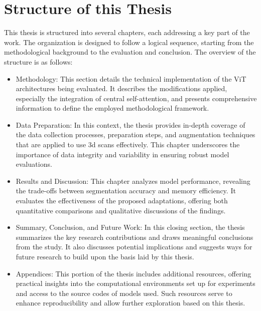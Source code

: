 \section{Structure of this Thesis}
This thesis is structured into several chapters, each addressing a key part of the work. The organization is designed to follow a logical sequence, starting from the methodological background to the evaluation and conclusion. The overview of the structure is as follows:
\begin{itemize}
	\item Methodology: This section details the technical implementation of the ViT architectures being evaluated. It describes the modifications applied, especially the integration of central self-attention, and presents comprehensive information to define the employed methodological framework.
	
	\item Data Preparation: In this context, the thesis provides in-depth coverage of the data collection processes, preparation steps, and augmentation techniques that are applied to use \gls{3d} scans effectively. This chapter underscores the importance of data integrity and variability in ensuring robust model evaluations.
	
	\item Results and Discussion: This chapter analyzes model performance, revealing the trade-offs between segmentation accuracy and memory efficiency. It evaluates the effectiveness of the proposed adaptations, offering both quantitative comparisons and qualitative discussions of the findings.
	
	\item Summary, Conclusion, and Future Work: In this closing section, the thesis summarizes the key research contributions and draws meaningful conclusions from the study. It also discusses potential implications and suggests ways for future research to build upon the basis laid by this thesis.
	
	\item Appendices: This portion of the thesis includes additional resources, offering practical insights into the computational environments set up for experiments and access to the source codes of models used. Such resources serve to enhance reproducibility and allow further exploration based on this thesis.
\end{itemize}
